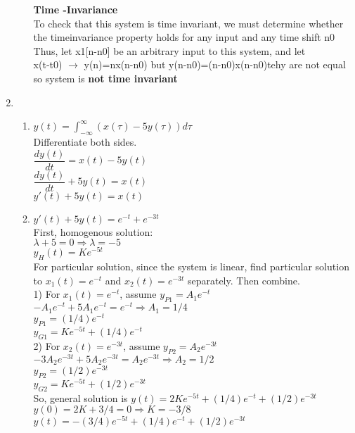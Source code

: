 \documentclass[10pt,a4paper, margin=1in]{article}
\begin{document}
\begin{enumerate}
\begin{enumerate}
   	\textbf{Time -Invariance} \\
	To check that this system is time invariant, we must determine whether the timeinvariance property holds for any input and any time shift n0 Thus, let x1[n-n0] be an arbitrary input to this system, and let \\
	x(t-t0) $\rightarrow$ y(n)=nx(n-n0) but y(n-n0)=(n-n0)x(n-n0)tehy are not equal so system is \textbf{ not time invariant }
	\\
	
	
   	
    
    \end{enumerate}

\item %
    \begin{enumerate}
    \item %
    $y(t)=\int_{-\infty}^{\infty}(x(\tau)-5y(\tau))d\tau$\\
    Differentiate both sides. \\
    $\dfrac{dy(t)}{dt}=x(t)-5y(t)$\\
    $\dfrac{dy(t)}{dt}+5y(t)=x(t)$\\
    $y'(t)+5y(t)=x(t)$
    \item %
    $ y'(t)+5y(t)=e^{-t}+e^{-3t} $\\
    First, homogenous solution:\\
    $\lambda+5=0 \Rightarrow \lambda = -5$\\
    $ y_H(t)=Ke^{-5t} $\\
    For particular solution, since the system is linear, find particular solution to $x_1(t)=e^{-t}$ and $x_2(t)=e^{-3t}$ separately. Then combine.\\
    1) For $x_1(t)=e^{-t}$, assume $y_{P1}=A_1e^{-t}$\\
    $-A_1e^{-t}+5A_1e^{-t}=e^{-t} \Rightarrow A_1=1/4$\\
    $y_{P1}=(1/4)e^{-t}$\\
    $y_{G1}=Ke^{-5t}+(1/4)e^{-t}$\\
    2) For $x_2(t)=e^{-3t}$, assume $y_{P2}=A_2e^{-3t}$\\
    $-3A_2e^{-3t}+5A_2e^{-3t}=A_2e^{-3t} \Rightarrow A_2=1/2$\\
    $y_{P2}=(1/2)e^{-3t}$\\
    $y_{G2}=Ke^{-5t}+(1/2)e^{-3t}$\\
    So, general solution is $y(t)=2Ke^{-5t}+(1/4)e^{-t}+(1/2)e^{-3t}$\\
    $y(0)=2K+3/4=0 \Rightarrow K=-3/8$\\
    $y(t)=-(3/4)e^{-5t}+(1/4)e^{-t}+(1/2)e^{-3t}$
    \end{enumerate}


\end{enumerate}
\end{document}
